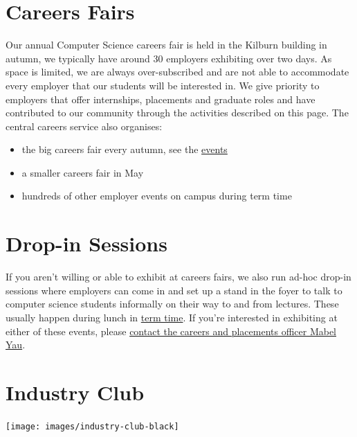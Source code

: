\documentclass[
  12pt,
]{book}
\providecommand{\tightlist}{%
  \setlength{\itemsep}{0pt}\setlength{\parskip}{0pt}}
\begin{document}
\hypertarget{careersfairs}{%
\section{Careers Fairs}\label{careersfairs}}

Our annual Computer Science careers fair is held in the Kilburn building in autumn, we typically have around 30 employers exhibiting over two days. As space is limited, we are always over-subscribed and are not able to accommodate every employer that our students will be interested in. We give priority to employers that offer internships, placements and graduate roles and have contributed to our community through the activities described on this page. The central careers service also organises:

\begin{itemize}
\tightlist
\item
  the big careers fair every autumn, see the \href{https://www.careers.manchester.ac.uk/events/}{events}
\item
  a smaller careers fair in May
\item
  hundreds of other employer events on campus during term time \citep{highfliers2020}
\end{itemize}

\hypertarget{dropins}{%
\section{Drop-in Sessions}\label{dropins}}

If you aren't willing or able to exhibit at careers fairs, we also run ad-hoc drop-in sessions where employers can come in and set up a stand in the foyer to talk to computer science students informally on their way to and from lectures. These usually happen during lunch in \href{https://www.manchester.ac.uk/discover/key-dates/}{term time}. If you're interested in exhibiting at either of these events, please \protect\hyperlink{office}{contact the careers and placements officer Mabel Yau}.

\hypertarget{industryclub}{%
\section{Industry Club}\label{industryclub}}

\begin{center}\texttt{[image: images/industry-club-black]} \end{center}
\end{document}

